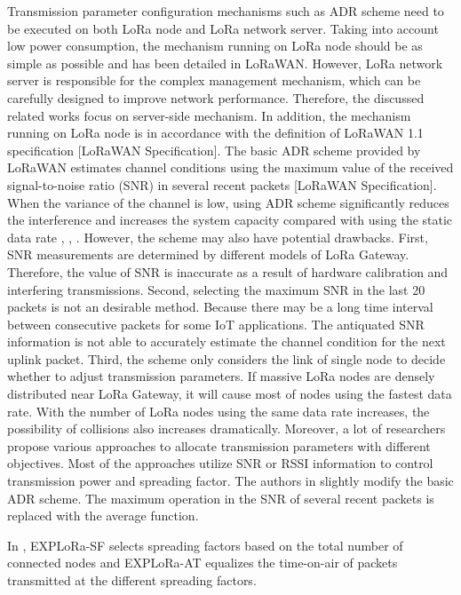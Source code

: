 Transmission parameter configuration mechanisms such as ADR scheme need to be executed on both LoRa node and LoRa network server.
Taking into account low power consumption,
	the mechanism running on LoRa node should be as simple as possible and has been detailed in LoRaWAN.
However,
	LoRa network server is responsible for the complex management mechanism,
	which can be carefully designed to improve network performance.
Therefore,
	the discussed related works focus on server-side mechanism.
In addition,
	the mechanism running on LoRa node is in accordance with the definition of LoRaWAN 1.1 specification [LoRaWAN Speciﬁcation].
The basic ADR scheme provided by LoRaWAN estimates channel conditions using the maximum value of the received signal-to-noise ratio (SNR) in several recent packets [LoRaWAN Speciﬁcation].
When the variance of the channel is low,
	using ADR scheme significantly reduces the interference and increases the system capacity compared with using the static data rate \cite{bor_lora_2016},
	\cite{slabicki_adaptive_2018},
	\cite{zheng_smdp-based_2015}.
However,
	the scheme may also have potential drawbacks.
First,
	SNR measurements are determined by different models of LoRa Gateway.
Therefore,
	the value of SNR is inaccurate as a result of hardware calibration and interfering transmissions.
Second,
	selecting the maximum SNR in the last 20 packets is not an desirable method.
Because there may be a long time interval between consecutive packets for some IoT applications.
The antiquated SNR information is not able to accurately estimate the channel condition for the next uplink packet.
Third,
	the scheme only considers the link of single node to decide whether to adjust transmission parameters.
If massive LoRa nodes are densely distributed near LoRa Gateway,
	it will cause most of nodes using the fastest data rate.
With the number of LoRa nodes using the same data rate increases,
	the possibility of collisions also increases dramatically.
Moreover,
	a lot of researchers propose various approaches to allocate transmission parameters with different objectives.
Most of the approaches utilize SNR or RSSI information to control transmission power and spreading factor.
The authors in \cite{slabicki_adaptive_2018} slightly modify the basic ADR scheme.
The maximum operation in the SNR of several recent packets is replaced with the average function.

In \cite{cuomo_explora_2017},
	EXPLoRa-SF selects spreading factors based on the total number of connected nodes and EXPLoRa-AT equalizes the time-on-air of packets transmitted at the different spreading factors.

